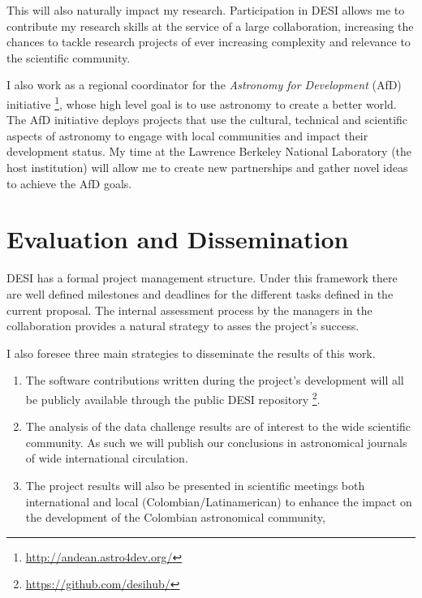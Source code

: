 \documentclass[12pt]{article}
\begin{document}
This will also naturally impact my research. Participation in DESI
allows me to contribute my research skills at the service of a large
collaboration, increasing the chances to tackle research projects of
ever increasing complexity and relevance to the scientific community.  



I also work as a regional coordinator for the \emph{Astronomy for
Development} (AfD)
initiative \footnote{\url{http://andean.astro4dev.org/}}, whose high
level goal is to use astronomy to create a better world.
The AfD initiative deploys projects that use the cultural, technical
and scientific aspects of astronomy to engage with local communities
and impact their development status.  My time at the Lawrence Berkeley
National Laboratory (the host institution) will allow me to create new
partnerships and gather novel ideas to achieve the AfD goals. 



\section*{Evaluation and Dissemination}


DESI has a formal project management structure. 
Under this framework there are well defined milestones
and deadlines for the different tasks defined in the current
proposal. The internal assessment process by the managers in the
collaboration provides a natural strategy to asses the project's success.  

\noindent
I also foresee three main strategies to disseminate the results of this
work.
\begin{enumerate}
\item The software contributions written during the project's
development will all be publicly available through the public DESI
repository \footnote{\url{https://github.com/desihub/}}.  


\item The analysis of the data challenge results are of interest to
the wide scientific community. As such we will publish our conclusions
in astronomical journals of wide international circulation. 

\item The project results will also be presented in scientific
meetings both international and local (Colombian/Latinamerican) 
to enhance the impact on the development of the Colombian astronomical
community,  
\end{enumerate}
\end{document}
